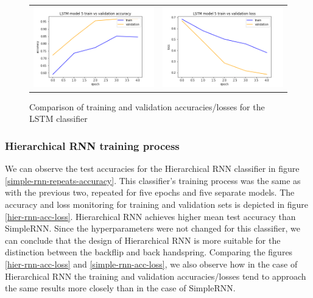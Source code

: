 \begin{figure}
\begin{tabular}{cc}
\includegraphics[width=6.5cm]{images/classifier/model-output-lstm-339/model-5-train-vs-validation-accuracy}&
\includegraphics[width=6.5cm]{images/classifier/model-output-lstm-339/model-5-train-vs-validation-loss}\\

\end{tabular}
    \caption{Comparison of training and validation accuracies/losses for the LSTM classifier}
    \label{lstm-acc-loss}
\end{figure}

\subsubsection{Hierarchical RNN training process} 

We can observe the test accuracies for the Hierarchical RNN classifier in figure \ref{simple-rnn-repeats-accuracy}. This classifier's training process was the same as with the previous two, repeated for five epochs and five separate models. The accuracy and loss monitoring for training and validation sets is depicted in figure \ref{hier-rnn-acc-loss}. Hierarchical RNN achieves higher mean test accuracy than SimpleRNN. Since the hyperparameters were not changed for this classifier, we can conclude that the design of Hierarchical RNN is more suitable for the distinction between the backflip and back handspring. Comparing the figures \ref{hier-rnn-acc-loss} and \ref{simple-rnn-acc-loss}, we also observe how in the case of Hierarchical RNN the training and validation accuracies/losses tend to approach the same results more closely than in the case of SimpleRNN.

